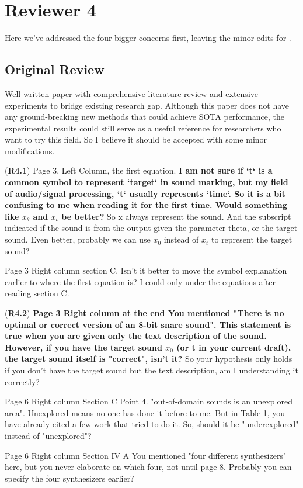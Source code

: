 \documentclass[11pt]{article}
\begin{document}
\section{Reviewer 4}
Here we've addressed the four bigger concerns first, leaving the minor edits for .


\subsection{Original Review}
Well written paper with comprehensive literature review and extensive experiments to bridge existing research gap. Although this paper does not have any ground-breaking new methods that could achieve SOTA performance, the experimental results could still serve as a useful reference for researchers who want to try this field. So I believe it should be accepted with some minor modifications.

(\textbf{R4.1}) Page 3, Left Column, the first equation.
\textbf{I am not sure if `t` is a common symbol to represent `target` in sound marking, but my field of audio/signal processing, `t` usually represents `time`. So it is a bit confusing to me when reading it for the first time.
Would something like $x_\theta$ and $x_t$ be better?} So x always represent the sound. And the subscript indicated if the sound is from the output given the parameter theta, or the target sound. Even better, probably we can use $x_0$ instead of $x_t$ to represent the target sound?

Page 3 Right column section C.
Isn't it better to move the symbol explanation earlier to where the first equation is? I could only under the equations after reading section C.

(\textbf{R4.2}) \textbf{Page 3 Right column at the end
You mentioned "There is no optimal or correct version of an 8-bit snare sound".
This statement is true when you are given only the text description of the sound. However, if you have the target sound $x_0$ (or t in your current draft), the target sound itself is "correct", isn't it?} So your hypothesis only holds if you don't have the target sound but the text description, am I understanding it correctly?

Page 6 Right column Section C Point 4.
"out-of-domain sounds is an unexplored area". Unexplored means no one has done it before to me. But in Table 1, you have already cited a few work that tried to do it. So, should it be "underexplored" instead of "unexplored"?


Page 6 Right column Section IV A
You mentioned "four different synthesizers" here, but you never elaborate on which four, not until page 8. Probably you can specify the four synthesizers earlier?
\end{document}
